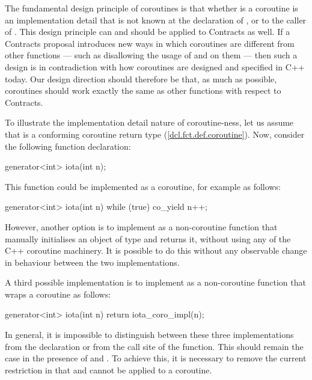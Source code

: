 The fundamental design principle of coroutines is that whether  is a coroutine is an implementation detail that is not known at the declaration of , or to the caller of . This design principle can and should be applied to Contracts as well. If a Contracts proposal introduces new ways in which coroutines are different from other functions --- such as disallowing the usage of  and  on them --- then such a design is in contradiction with how coroutines are designed and specified in C++ today. Our design direction should therefore be that, as much as possible, coroutines should work exactly the same as other functions with respect to Contracts.

To illustrate the implementation detail nature of coroutine-ness, let us assume that  is a conforming coroutine return type (\href{https://eel.is/c++draft/dcl.fct.def.coroutine}{[dcl.fct.def.coroutine]}). Now, consider the following function declaration:
\begin{codeblock}
generator<int> iota(int n); 
\end{codeblock}
This function could be implemented as a coroutine, for example as follows:
\begin{codeblock}
generator<int> iota(int n) {
  while (true)
    co_yield n++;
}
\end{codeblock}
However, another option is to implement  as a non-coroutine function that manually initialises an object of type  and returns it, without using any of the C++ coroutine machinery. It is possible to do this without any observable change in behaviour between the two implementations.

A third possible implementation is to implement  as a non-coroutine function that wraps a coroutine  as follows:
\begin{codeblock}
generator<int> iota(int n) {
  return iota_coro_impl(n);
}
\end{codeblock}
In general, it is impossible to distinguish between these three implementations from the declaration or from the call site of the function. This should remain the case in the presence of  and . To achieve this, it is necessary to remove the current restriction in \cite{P2900R8} that  and  cannot be applied to a coroutine.


